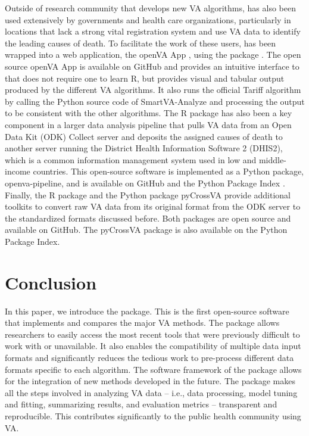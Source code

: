 Outside of research community that develops new VA algorithms,
 has also been used extensively by governments and
health care organizations, particularly in locations that lack a strong
vital registration system and use VA data to identify the leading causes
of death. To facilitate the work of these users,  has
been wrapped into a web application, the openVA App \citep{openva-app},
using the  package \citep{shinypkg}. The open source
openVA App is available on GitHub and provides an intuitive interface to
 that does not require one to learn R, but provides
visual and tabular output produced by the different VA algorithms. It
also runs the official Tariff algorithm by calling the Python source
code of SmartVA-Analyze \citep{smartVA-git} and processing the output to
be consistent with the other algorithms. The  R package
has also been a key component in a larger data analysis pipeline that
pulls VA data from an Open Data Kit (ODK) Collect server and deposits
the assigned causes of death to another server running the District
Health Information Software 2 (DHIS2), which is a common information
management system used in low and middle-income countries. This
open-source software is implemented as a Python package,
openva-pipeline, and is available on GitHub and the Python Package Index
\citep{openva-pipe}. Finally, the R package 
\citep{crossvapkg} and the Python package pyCrossVA \citep{pyCrossVA}
provide additional toolkits to convert raw VA data from its original
format from the ODK server to the standardized formats discussed before.
Both packages are open source and available on GitHub. The pyCrossVA
package is also available on the Python Package Index.

\hypertarget{conclusion}{%
\section{Conclusion}\label{conclusion}}

In this paper, we introduce the  package. This is the
first open-source software that implements and compares the major VA
methods. The  package allows researchers to easily
access the most recent tools that were previously difficult to work with
or unavailable. It also enables the compatibility of multiple data input
formats and significantly reduces the tedious work to pre-process
different data formats specific to each algorithm. The software
framework of the  package allows for the integration of
new methods developed in the future. The  package makes
all the steps involved in analyzing VA data -- i.e., data processing,
model tuning and fitting, summarizing results, and evaluation metrics --
transparent and reproducible. This contributes significantly to the
public health community using VA.

